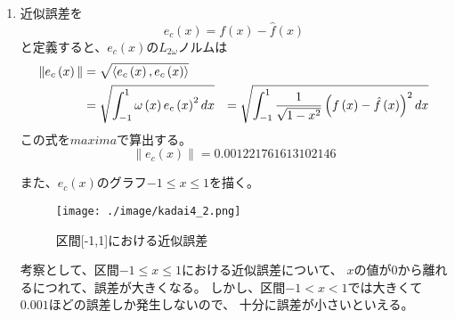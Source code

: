\begin{enumerate}
  \item 近似誤差を
  \begin{equation}
    e_{c}\left(x\right) = f\left(x\right) - \hat{f}\left(x\right)
  \end{equation}
  と定義すると、\(e_{c}\left(x\right)\)の\(L_{2\omega}\)ノルムは
  \begin{align}
      \|e_{c}\left(x\right)\|
      &= \sqrt{\left<e_{c}\left(x\right), e_{c}\left(x\right)\right>}\notag\\
      &= \sqrt{\int^{1}_{-1} \omega\left(x\right) e_{c}\left(x\right)^{2} dx}
      &= \sqrt{\int^{1}_{-1} \frac{1}{\sqrt{1 - x^{2}}} \left(f\left(x\right) - \hat{f}\left(x\right) \right)^{2} dx}
  \end{align}
  この式を\(maxima\)で算出する。
  \begin{equation}
    \|e_{c}\left(x\right)\| = 0.001221761613102146
  \end{equation}

  また、\(e_c\left(x\right)\)のグラフ\(-1 \leq x \leq 1\)を描く。

  \begin{figure}[htbp]
    \centering
    \texttt{[image: ./image/kadai4\_2.png]}
    \caption{区間[-1,1]における近似誤差}
    \label{figure:4_2_a}
  \end{figure}

  考察として、区間\(-1 \leq x \leq 1\)における近似誤差について、
  \(x\)の値が\(0\)から離れるにつれて、誤差が大きくなる。
  しかし、区間\(-1 < x < 1\)では大きくて\(0.001\)ほどの誤差しか発生しないので、
  十分に誤差が小さいといえる。






\end{enumerate}
